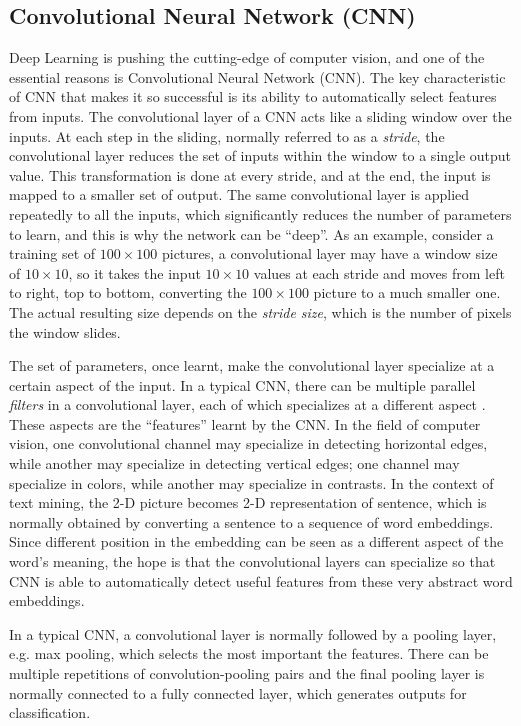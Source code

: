 \subsection{Convolutional Neural Network (CNN)}

Deep Learning is pushing the cutting-edge of computer vision, and one of the essential reasons is Convolutional Neural Network (CNN). The key characteristic of CNN that makes it so successful is its ability to automatically select features from inputs. The convolutional layer of a CNN acts like a sliding window over the inputs. At each step in the sliding, normally referred to as a {\em stride}, the convolutional layer reduces the set of inputs within the window to a single output value. This transformation is done at every stride, and at the end, the input is mapped to a smaller set of output. The same convolutional layer is applied repeatedly to all the inputs, which significantly reduces the number of parameters to learn, and this is why the network can be ``deep''. As an example, consider a training set of $100 \times 100$ pictures, a convolutional layer may have a window size of $10 \times 10$, so it takes the input $10 \times 10$ values at each stride and moves from left to right, top to bottom, converting the $100 \times 100$ picture to a much smaller one. The actual resulting size depends on the {\em stride size}, which is the number of pixels the window slides. 

The set of parameters, once learnt, make the convolutional layer specialize at a certain aspect of the input. In a typical CNN, there can be multiple parallel {\em filters} in a convolutional layer, each of which specializes at a different aspect \cite{krizhevsky2012}. These aspects are the ``features'' learnt by the CNN. In the field of computer vision, one convolutional channel may specialize in detecting horizontal edges, while another may specialize in detecting vertical edges; one channel may specialize in colors, while another may specialize in contrasts. In the context of text mining, the 2-D picture becomes 2-D representation of sentence, which is normally obtained by converting a sentence to a sequence of word embeddings. Since different position in the embedding can be seen as a different aspect of the word's meaning, the hope is that the convolutional layers can specialize so that CNN is able to automatically detect useful features from these very abstract word embeddings. 

In a typical CNN, a convolutional layer is normally followed by a pooling layer, e.g. max pooling, which selects the most important the features. There can be multiple repetitions of convolution-pooling pairs and the final pooling layer is normally connected to a fully connected layer, which generates outputs for classification.
